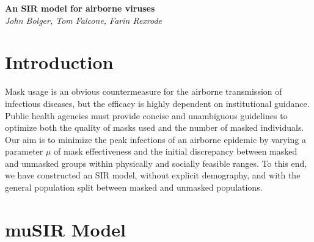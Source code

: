 \documentclass[11pt]{article}
\begin{document}
\begin{center}
\Large\textbf{An SIR model for airborne viruses}\\
\large\textit{John Bolger, Tom Falcone, Farin Rexrode}
\end{center}

\section*{Introduction}
Mask usage is an obvious countermeasure for the airborne transmission of infectious diseases, but the efficacy is highly dependent on institutional guidance. Public health agencies must provide concise and unambiguous guidelines to optimize both the quality of masks used and the number of masked individuals. Our aim is to minimize the peak infections of an airborne epidemic by varying a parameter $\mu$ of mask effectiveness and the initial discrepancy between masked and unmasked groups within physically and socially feasible ranges. To this end, we have constructed an SIR model, without explicit demography, and with the general population split between masked and unmasked populations.

\section*{muSIR Model}
\vspace{1cm}
\end{document}
